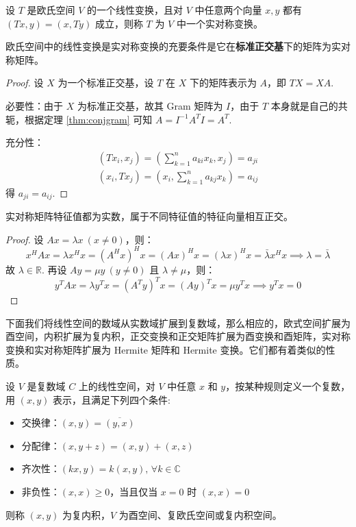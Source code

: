 \begin{definition}[实对称变换]
设 $T$ 是欧氏空间 $V$ 的一个线性变换，且对 $V$ 中任意两个向量 $x,y$ 都有 $(Tx,y)=(x,Ty)$ 成立，则称 $T$ 为 $V$ 中一个实对称变换。
\end{definition}

\begin{theorem}[实对称变换与实对称矩阵]
欧氏空间中的线性变换是实对称变换的充要条件是它在\textbf{标准正交基}下的矩阵为实对称矩阵。
\end{theorem}
\begin{proof}
设 $X$ 为一个标准正交基，设 $T$ 在 $X$ 下的矩阵表示为 $A$，即 $TX=XA$.

必要性：由于 $X$ 为标准正交基，故其 Gram 矩阵为 $I$，由于 $T$ 本身就是自己的共轭，根据定理 \ref{thm:conjgram} 可知 $A=I^{-1}A^TI=A^T$.

充分性：
\begin{gather*}
(Tx_i,x_j)=\left(\sum_{k=1}^na_{ki}x_k,x_j\right)=a_{ji}\\
(x_i,Tx_j)=\left(x_i,\sum_{k=1}^na_{kj}x_k\right)=a_{ij}
\end{gather*}
得 $a_{ji}=a_{ij}$.
\end{proof}

\begin{theorem}
实对称矩阵特征值都为实数，属于不同特征值的特征向量相互正交。
\end{theorem}
\begin{proof}
设 $Ax=\lambda x\ (x\neq 0)$，则：
\[
x^HAx=\lambda x^Hx=(A^Hx)^Hx=(Ax)^Hx=(\lambda x)^Hx=\bar\lambda x^Hx\implies \lambda=\bar\lambda
\]
故 $\lambda\in\mathbb R$.
再设 $Ay=\mu y\ (y\neq 0)$ 且 $\lambda\neq \mu$，则：
\[
y^TAx=\lambda y^Tx=(A^Ty)^Tx=(Ay)^Tx=\mu y^Tx\implies y^Tx=0
\]
\end{proof}

下面我们将线性空间的数域从实数域扩展到复数域，那么相应的，欧式空间扩展为酉空间，内积扩展为复内积，正交变换和正交矩阵扩展为酉变换和酉矩阵，实对称变换和实对称矩阵扩展为 Hermite 矩阵和 Hermite 变换。它们都有着类似的性质。

\begin{definition}
设 $V$ 是复数域 $C$ 上的线性空间，对 $V$ 中任意 $x$ 和 $y$，按某种规则定义一个复数，用 $(x,y)$ 表示，且满足下列四个条件:
\begin{itemize}
    \item 交换律：$(x,y)=\overline{(y,x)}$
    \item 分配律：$(x,y+z)=(x,y)+(x,z)$
    \item 齐次性：$(kx,y)=k(x,y),\,\forall k\in \mathbb C$
    \item 非负性：$(x,x)\geq 0$，当且仅当 $x=0$ 时 $(x,x)=0$
\end{itemize}
则称 $(x,y)$ 为复内积，$V$ 为酉空间、复欧氏空间或复内积空间。
\end{definition}

